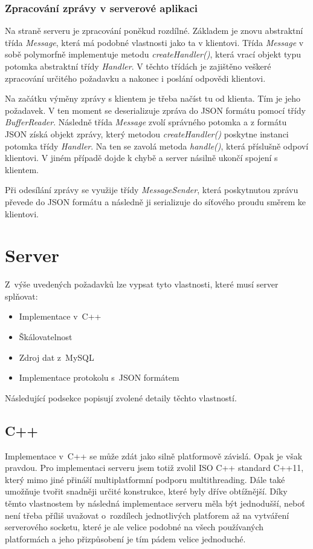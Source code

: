 \documentclass[thesis=B,czech]{FITthesis}[2013/10/20]
\begin{document}
\subsubsection{Zpracování zprávy v serverové aplikaci}

Na straně serveru je zpracování poněkud rozdílné. Základem je znovu abstraktní třída \textit{Message}, která má podobné vlastnosti jako ta v klientovi. Třída \textit{Message} v sobě polymorfně implementuje metodu \textit{createHandler()}, která vrací objekt typu potomka abstraktní třídy \textit{Handler}. V těchto třídách je zajištěno veškeré zpracování určitého požadavku a nakonec i poslání odpovědi klientovi.

Na začátku výměny zprávy s klientem je třeba načíst tu od klienta. Tím je jeho požadavek. V ten moment se deserializuje zpráva do JSON formátu pomocí třídy \textit{BufferReader}. Následně třída \textit{Message} zvolí správného potomka a z formátu JSON získá objekt zprávy, který metodou \textit{createHandler()} poskytne instanci potomka třídy \textit{Handler}. Na ten se zavolá metoda \textit{handle()}, která příslušně odpoví klientovi. V jiném případě dojde k chybě a server násilně ukončí spojení s klientem.

Při odesílání zprávy se využije třídy \textit{MessageSender}, která poskytnutou zprávu převede do JSON formátu a následně ji serializuje do síťového proudu směrem ke klientovi.

\section{Server}

Z~výše uvedených požadavků lze vypsat tyto vlastnosti, které musí server splňovat:

\begin{itemize}
  \item{Implementace v~C++}
  \item{Škálovatelnost}
  \item{Zdroj dat z~MySQL}
  \item{Implementace protokolu s~JSON formátem}
\end{itemize}

Následující podsekce popisují zvolené detaily těchto vlastností.

\subsection{C++}

Implementace v~C++ se může zdát jako silně platformově závislá. Opak je však pravdou. Pro implementaci serveru jsem totiž zvolil ISO C++ standard C++11, který mimo jiné přináší multiplatformní podporu multithreading. Dále také umožňuje tvořit snadněji určité konstrukce, které byly dříve obtížnější. Díky těmto vlastnostem by následná implementace serveru měla být jednodušší, neboť není třeba příliš uvažovat o~rozdílech jednotlivých platforem až na vytváření serverového socketu, které je ale velice podobné na všech používaných platformách a jeho přizpůsobení je tím pádem velice jednoduché.
\end{document}
